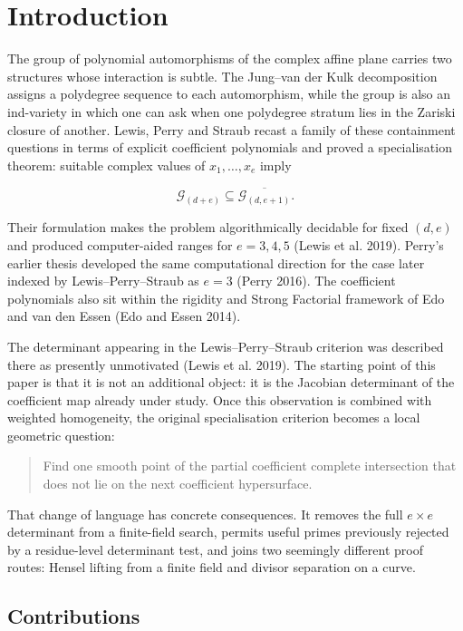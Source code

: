 \documentclass[
]{article}
\begin{document}
\section{Introduction}\label{introduction}

The group of polynomial automorphisms of the complex affine plane
carries two structures whose interaction is subtle. The Jung--van der
Kulk decomposition assigns a polydegree sequence to each automorphism,
while the group is also an ind-variety in which one can ask when one
polydegree stratum lies in the Zariski closure of another. Lewis, Perry
and Straub recast a family of these containment questions in terms of
explicit coefficient polynomials and proved a specialisation theorem:
suitable complex values of \(x_1,\ldots,x_e\) imply

\[
\mathcal G_{(d+e)}\subseteq
\overline{\mathcal G_{(d,e+1)}}.
\tag{1.1}
\]

Their formulation makes the problem algorithmically decidable for fixed
\((d,e)\) and produced computer-aided ranges for \(e=3,4,5\) (Lewis et
al. 2019). Perry's earlier thesis developed the same computational
direction for the case later indexed by Lewis--Perry--Straub as \(e=3\)
(Perry 2016). The coefficient polynomials also sit within the rigidity
and Strong Factorial framework of Edo and van den Essen (Edo and Essen
2014).

The determinant appearing in the Lewis--Perry--Straub criterion was
described there as presently unmotivated (Lewis et al. 2019). The
starting point of this paper is that it is not an additional object: it
is the Jacobian determinant of the coefficient map already under study.
Once this observation is combined with weighted homogeneity, the
original specialisation criterion becomes a local geometric question:

\begin{quote}
Find one smooth point of the partial coefficient complete intersection
that does not lie on the next coefficient hypersurface.
\end{quote}

That change of language has concrete consequences. It removes the full
\(e\times e\) determinant from a finite-field search, permits useful
primes previously rejected by a residue-level determinant test, and
joins two seemingly different proof routes: Hensel lifting from a finite
field and divisor separation on a curve.

\subsection{Contributions}\label{contributions}
\end{document}
